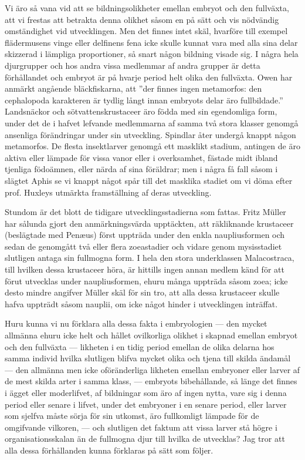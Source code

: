 Vi äro så vana vid att se bildningsolikheter emellan embryot och den fullväxta, att vi frestas att betrakta denna olikhet såsom en på sätt och vis nödvändig omständighet vid utvecklingen. Men det finnes intet skäl, hvarföre till exempel flädermusens vinge eller delfinens fena icke skulle kunnat vara med alla sina delar skizzerad i lämpliga proportioner, så snart någon bildning visade sig. I några hela djurgrupper och hos andra vissa medlemmar af andra grupper är detta förhållandet och embryot är på hvarje period helt olika den fullväxta. Owen har anmärkt angående bläckfiskarna, att ”der finnes ingen metamorfos: den cephalopoda karakteren är tydlig långt innan embryots delar äro fullbildade.” Landsnäckor och sötvattenskrustaceer äro födda med sin egendomliga form, under det de i hafvet lefvande medlemmarna af samma två stora klasser genomgå ansenliga förändringar under sin utveckling. Spindlar åter undergå knappt någon metamorfos. De flesta insektlarver genomgå ett masklikt stadium, antingen de äro aktiva eller lämpade för vissa vanor eller i overksamhet, fästade midt ibland tjenliga födoämnen, eller närda af sina föräldrar; men i några få fall såsom i slägtet Aphis se vi knappt något spår till det masklika stadiet om vi döma efter prof. Huxleys utmärkta framställning af deras utveckling.

Stundom är det blott de tidigare utvecklingsstadierna som fattas. Fritz Müller har sålunda gjort den anmärkningsvärda upptäckten, att räkliknande krustaceer (beslägtade med Penæus) först uppträda under den enkla naupliusformen och sedan de genomgått två eller flera zoeastadier och vidare genom mysisstadiet slutligen antaga sin fullmogna form. I hela den stora underklassen Malacostraca, till hvilken dessa krustaceer höra, är hittills ingen annan medlem känd för att förut utvecklas under naupliusformen, ehuru många uppträda såsom zoea; icke desto mindre angifver Müller skäl för sin tro, att alla dessa krustaceer skulle hafva uppträdt såsom nauplii, om icke något hinder i utvecklingen inträffat.

Huru kunna vi nu förklara alla dessa fakta i embryologien — den mycket allmänna ehuru icke helt och hållet ovilkorliga olikhet i skapnad emellan embryot och den fullväxta — likheten i en tidig period emellan de olika delarna hos samma individ hvilka slutligen blifva mycket olika och tjena till skilda ändamål — den allmänna men icke oföränderliga likheten emellan embryoner eller larver af de mest skilda arter i samma klass, — embryots bibehållande, så länge det finnes i ägget eller moderlifvet, af bildningar som äro af ingen nytta, vare sig i denna period eller senare i lifvet, under det embryoner i en senare period, eller larver som sjelfva måste sörja för sin utkomst, äro fullkomligt lämpade för de omgifvande vilkoren, — och slutligen det faktum att vissa larver stå högre i organisationsskalan än de fullmogna djur till hvilka de utvecklas? Jag tror att alla dessa förhållanden kunna förklaras på sätt som följer.

